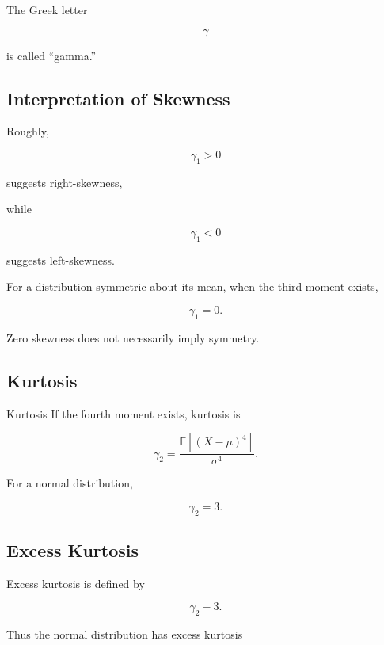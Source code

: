 The Greek letter

\[
\gamma
\]

is called ``gamma.''

\subsection{Interpretation of Skewness}
\label{subsec:skewness-interpretation}

Roughly,

\[
\gamma_1>0
\]

suggests right-skewness,

while

\[
\gamma_1<0
\]

suggests left-skewness.

For a distribution symmetric about its mean, when the third moment
exists,

\[
\boxed{
\gamma_1=0.
}
\]

Zero skewness does not necessarily imply symmetry.

\subsection{Kurtosis}
\label{subsec:kurtosis}

\begin{definitionbox}{Kurtosis}
If the fourth moment exists, kurtosis is

\[
\boxed{
\gamma_2
=
\frac{
\mathbb{E}[(X-\mu)^4]
}{
\sigma^4
}.
}
\]
\end{definitionbox}

For a normal distribution,

\[
\boxed{
\gamma_2=3.
}
\]

\subsection{Excess Kurtosis}
\label{subsec:excess-kurtosis}

Excess kurtosis is defined by

\[
\boxed{
\gamma_2-3.
}
\]

Thus the normal distribution has excess kurtosis

